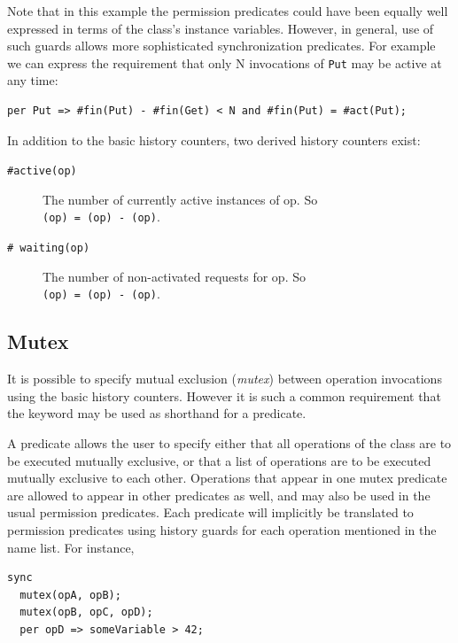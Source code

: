 \documentclass{overturerepchap}
\begin{document}
Note that in this example the permission predicates could have been
equally well expressed in terms of the class's instance
variables. However, in general, use of such guards allows more
sophisticated synchronization predicates. For example we can express
the requirement that only N invocations of \texttt{Put} may be active at any
time:

\begin{lstlisting}
per Put => #fin(Put) - #fin(Get) < N and #fin(Put) = #act(Put);
\end{lstlisting}

In addition to the basic history counters, two derived history counters exist:

\begin{description}
\item[\texttt{\#active(op)}] The number of currently active instances
of op.  So \\ {\bf{}}\texttt{(op) = }{\bf{}}\texttt{(op) - }{\bf{}}\texttt{(op)}.
\item[\texttt{\# waiting(op)}] The number of non-activated requests for
op.  So \\ {\bf{}}\texttt{(op) = }{\bf{}}\texttt{(op) - }{\bf{}}\texttt{(op)}.
\end{description}

\subsection{Mutex}

It is possible to specify mutual exclusion (\emph{mutex}) between operation
invocations using the basic history counters. However it is such a
common requirement that the keyword {\bf{}} may be used as shorthand for
a {\bf{}} predicate.

A {\bf{}} predicate allows the user to specify either
that all operations of the class are to be executed mutually
exclusive, or that a list of operations are to be executed mutually
exclusive to each other. Operations that appear in one mutex predicate
are allowed to appear in other {\bf{}} predicates as
well, and may also be used in the usual permission predicates. Each
{\bf{}} predicate will implicitly be translated to
permission predicates using history guards for each operation
mentioned in the name list. For instance,

\begin{lstlisting}
sync
  mutex(opA, opB);
  mutex(opB, opC, opD);
  per opD => someVariable > 42;
\end{lstlisting}
\end{document}
